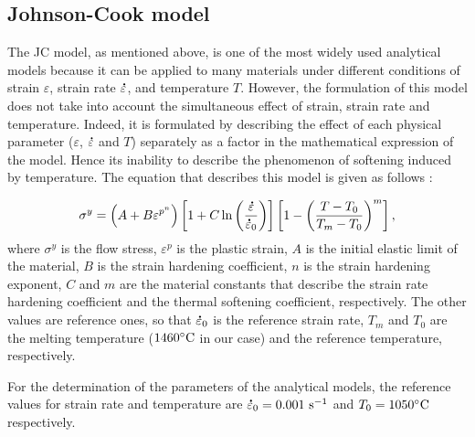 \documentclass[twoside,english,1p,final,sort&compress]{elsarticle}
\theoremstyle{plain}
\newcommand{\mdot}[1]{\accentset{\mbox{\bfseries .}}{#1}}
\newcommand{\ps}{\text{s}^{-1}}
\begin{document}
\subsection{Johnson-Cook model\label{sec:JC}}

The JC model, as mentioned above, is one of the most widely used analytical models because it can be applied to many materials under different conditions of strain $\varepsilon$, strain rate $\mdot\varepsilon$, and temperature $T$.
However, the formulation of this model does not take into account the simultaneous effect of strain, strain rate and temperature.
Indeed, it is formulated by describing the effect of each physical parameter ($\varepsilon$, $\mdot\varepsilon$ and $T$) separately as a factor in the mathematical expression of the model.
Hence its inability to describe the phenomenon of softening induced by temperature.
The equation that describes this model is given as follows \cite{Johnson-1983}:

\begin{equation}
\sigma^y=\left(A+B\varepsilon^{p^{n}}\right) \left[1+C\ln\left(\frac{\mdot\varepsilon}{\mdot\varepsilon_0}\right)\right] \left[1-\left(\frac{T-T_0}{T_m-T_0}\right)^{m}\right],\label{eq:Johnson-Cook}
\end{equation}
where $\sigma^y$ is the flow stress, $\varepsilon^p$ is the plastic strain, $A$ is the initial elastic limit of the material, $B$ is the strain hardening coefficient, $n$ is the strain hardening exponent, $C$ and $m$ are the material constants that describe the strain rate hardening coefficient and the thermal softening coefficient, respectively.
The other values are reference ones, so that $\mdot\varepsilon_0$ is the reference strain rate, $T_m$ and $T_0$ are the melting temperature ($1460\celsius$ in our case) and the reference temperature, respectively.

For the determination of the parameters of the analytical models, the reference values for strain rate and temperature are $\mdot\varepsilon_0=0.001~\ps$ and $T_0=1050\celsius$ respectively.
\end{document}
